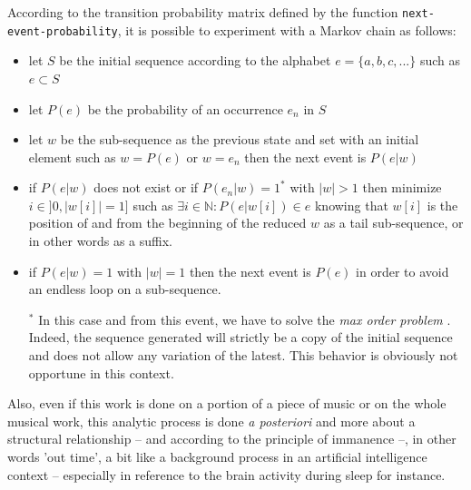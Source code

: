 \noindent
\begin{info}
\begin{minipage}{0.95\textwidth}
\vspace{0.25cm}
According to the transition probability matrix defined by the function \texttt{next-event-probability}, it is possible to experiment with a Markov chain as follows:
\begin{itemize}[leftmargin=0.45cm]
  \item let $S$ be the initial sequence according to the alphabet $e=\{a,b,c,...\}$ such as $e \subset S$
  \item let $P(e)$ be the probability of an occurrence $e_n$ in $S$
  \item let $w$ be the sub-sequence as the previous state and set with an initial element such as $w=P(e)$ or $w=e_n$ then the next event is $P(e|w)$
  \item if $P(e|w)$ does not exist or if $P(e_n|w)=1^*$ with $|w|>1$ then minimize $i \in ]0, |w[i]|=1]$ such as $\exists i \in \mathbb{N}:P(e|w[i]) \in e$ knowing that $w[i]$ is the position of and from the beginning of the reduced $w$ as a tail sub-sequence, or in other words as a suffix.
  \item if $P(e|w)=1$ with $|w|=1$ then the next event is $P(e)$ in order to avoid an endless loop on a sub-sequence. 
    \vspace{0.2cm}
\begin{spacing}{1.0}
\footnotesize $^*$ In this case and from this event, we have to solve the \textit{max order problem} \citep{mop}. Indeed, the sequence generated will strictly be a copy of the initial sequence and does not allow any variation of the latest. This behavior is obviously not opportune in this context.
\end{spacing}
\end{itemize}
\end{minipage}
\end{info}
\label{am:mc}

Also, even if this work is done on a portion of a piece of music or on the whole musical work, this analytic process is done \textit{a posteriori} and more about a structural relationship -- and according to the principle of immanence --, in other words 'out time', a bit like a background process in an artificial intelligence context -- especially in reference to the brain activity during sleep for instance.

